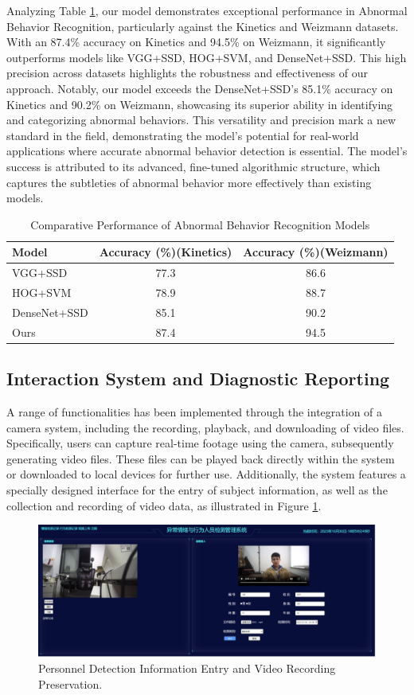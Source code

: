 \documentclass[preprint,12pt]{elsarticle}
\begin{document}
Analyzing Table \ref{Table5}, our model demonstrates exceptional performance in Abnormal Behavior Recognition, particularly against the Kinetics and Weizmann datasets. With an 87.4\% accuracy on Kinetics and 94.5\% on Weizmann, it significantly outperforms models like VGG+SSD, HOG+SVM, and DenseNet+SSD. This high precision across datasets highlights the robustness and effectiveness of our approach. Notably, our model exceeds the DenseNet+SSD's 85.1\% accuracy on Kinetics and 90.2\% on Weizmann, showcasing its superior ability in identifying and categorizing abnormal behaviors. This versatility and precision mark a new standard in the field, demonstrating the model's potential for real-world applications where accurate abnormal behavior detection is essential. The model's success is attributed to its advanced, fine-tuned algorithmic structure, which captures the subtleties of abnormal behavior more effectively than existing models.
\begin{table}[h]
\centering
\caption{Comparative Performance of Abnormal Behavior Recognition Models}\label{Table5}
\begin{tabular}{lcc}
\hline
Model & Accuracy (\%)(Kinetics) & Accuracy (\%)(Weizmann) \\
\hline
VGG+SSD & 77.3 & 86.6 \\
HOG+SVM & 78.9 & 88.7 \\
DenseNet+SSD & 85.1 & 90.2 \\
Ours & 87.4 & 94.5 \\
\hline
\end{tabular}
\end{table}

\subsection{ Interaction System and Diagnostic Reporting}

A range of functionalities has been implemented through the integration of a camera system, including the recording, playback, and downloading of video files. Specifically, users can capture real-time footage using the camera, subsequently generating video files. These files can be played back directly within the system or downloaded to local devices for further use. Additionally, the system features a specially designed interface for the entry of subject information, as well as the collection and recording of video data, as illustrated in Figure \ref{fig2}.

\begin{figure}[h]%
\centering
\includegraphics[width=1\textwidth]{Fig2.png}
\caption{Personnel Detection Information Entry and Video Recording Preservation.}\label{fig2}
\end{figure}
\end{document}
